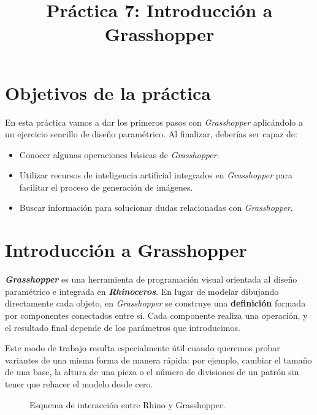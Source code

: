 \documentclass[
  spanish,
  11pt,
  a4paper,
  DIV=11,
  numbers=noendperiod]{scrartcl}
\title{Práctica 7: Introducción a Grasshopper}
\author{}
\date{}
\providecommand{\tightlist}{\setlength{\itemsep}{0pt}\setlength{\parskip}{0pt}}
\begin{document}
\maketitle

\renewcommand*\contentsname{Tabla de contenidos}
{
\hypersetup{linkcolor=}
\setcounter{tocdepth}{2}
\tableofcontents
}

\clearpage

\section{Objetivos de la práctica}
\label{objetivos-de-la-practica}

En esta práctica vamos a dar los primeros pasos con \emph{Grasshopper} aplicándolo a un ejercicio sencillo de diseño paramétrico. Al finalizar, deberías ser capaz de:

\begin{itemize}
\tightlist
\item Conocer algunas operaciones básicas de \emph{Grasshopper}.
\item Utilizar recursos de inteligencia artificial integrados en \emph{Grasshopper} para facilitar el proceso de generación de imágenes.
\item Buscar información para solucionar dudas relacionadas con \emph{Grasshopper}.
\end{itemize}

\section{Introducción a Grasshopper}
\label{introduccion-a-grasshopper}

\textbf{\emph{Grasshopper}} es una herramienta de programación visual orientada al diseño paramétrico e integrada en \textbf{\emph{Rhinoceros}}. En lugar de modelar dibujando directamente cada objeto, en \emph{Grasshopper} se construye una \textbf{definición} formada por componentes conectados entre sí. Cada componente realiza una operación, y el resultado final depende de los parámetros que introducimos.

Este modo de trabajo resulta especialmente útil cuando queremos probar variantes de una misma forma de manera rápida: por ejemplo, cambiar el tamaño de una base, la altura de una pieza o el número de divisiones de un patrón sin tener que rehacer el modelo desde cero.

\begin{figure}[H]
\caption{Esquema de interacción entre Rhino y Grasshopper.}\label{fig-scheme}
\end{figure}
\end{document}
